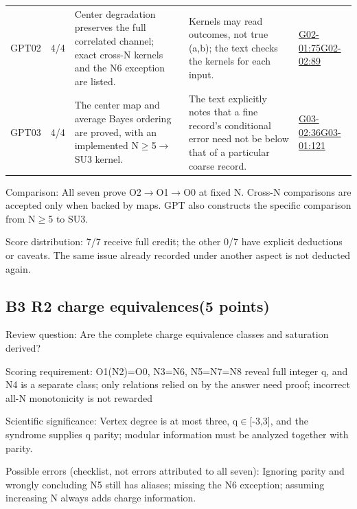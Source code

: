 \documentclass[11pt,a4paper]{article}
\begin{document}
{\begin{longtable}
{}GPT02 & 4/\allowbreak{}4 & Center degradation preserves the full correlated channel; exact cross-N kernels and the N6 exception are listed. & Kernels may read outcomes,\allowbreak{} not true (a,\allowbreak{}b); the text checks the kernels for each input. & \hyperref[src:G02-01]{G02-01:75}\newline \hyperref[src:G02-02]{G02-02:89}\tabularnewline
{}GPT03 & 4/\allowbreak{}4 & The center map and average Bayes ordering are proved,\allowbreak{} with an implemented N\ensuremath{\geq}5\ensuremath{\rightarrow}SU3 kernel. & The text explicitly notes that a fine record’s conditional error need not be below that of a particular coarse record. & \hyperref[src:G03-02]{G03-02:36}\newline \hyperref[src:G03-01]{G03-01:121}\tabularnewline
\bottomrule
\end{longtable}
}
Comparison: All seven prove O2\ensuremath{\rightarrow}O1\ensuremath{\rightarrow}O0 at fixed N. Cross-N comparisons are accepted only when backed by maps. GPT also constructs the specific comparison from N\ensuremath{\geq}5 to SU3.

Score distribution: 7/\allowbreak{}7 receive full credit; the other 0/\allowbreak{}7 have explicit deductions or caveats. The same issue already recorded under another aspect is not deducted again.

\clearpage
\subsection{B3 R2 charge equivalences(5 points)}
\label{aspect:B3}
Review question: Are the complete charge equivalence classes and saturation derived?

Scoring requirement: O1(N2)=O0,\allowbreak{} N3=N6,\allowbreak{} N5=N7=N8 reveal full integer q,\allowbreak{} and N4 is a separate class; only relations relied on by the answer need proof; incorrect all-N monotonicity is not rewarded

Scientific significance: Vertex degree is at most three,\allowbreak{} q\ensuremath{\in}[-3,\allowbreak{}3],\allowbreak{} and the syndrome supplies q parity; modular information must be analyzed together with parity.

Possible errors (checklist,\allowbreak{} not errors attributed to all seven): Ignoring parity and wrongly concluding N5 still has aliases; missing the N6 exception; assuming increasing N always adds charge information.
\end{document}

